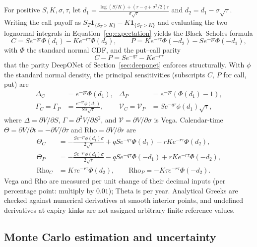 \documentclass[11pt,a4paper]{article}
\begin{document}
For positive \(S,K,\sigma,\tau\), let
\(d_1=\frac{\log(S/K)+(r-q+\sigma^2/2)\tau}{\sigma\sqrt\tau}\) and
\(d_2=d_1-\sigma\sqrt\tau\). Writing the call payoff as
\(S_T\mathbf1_{\{S_T>K\}}-K\mathbf1_{\{S_T>K\}}\) and evaluating the two
lognormal integrals in Equation~\eqref{eq:expectation} yields the
Black--Scholes formula \cite{black1973,merton1973}
\begin{equation}
 C=Se^{-q\tau}\Phi(d_1)-Ke^{-r\tau}\Phi(d_2),\qquad
 P=Ke^{-r\tau}\Phi(-d_2)-Se^{-q\tau}\Phi(-d_1),
 \label{eq:bs}
\end{equation}
with \(\Phi\) the standard normal CDF, and the put--call parity
\begin{equation}
 C-P=Se^{-q\tau}-Ke^{-r\tau}
 \label{eq:parity}
\end{equation}
that the parity DeepONet of Section~\ref{sec:deeponet} enforces
structurally. With \(\phi\) the standard normal density, the principal
sensitivities (subscripts \(C\), \(P\) for call, put) are
\begin{align}
 \Delta_C&=e^{-q\tau}\Phi(d_1), &
 \Delta_P&=e^{-q\tau}(\Phi(d_1)-1),\\
 \Gamma_C=\Gamma_P&=\frac{e^{-q\tau}\phi(d_1)}{S\sigma\sqrt\tau}, &
 \mathcal V_C=\mathcal V_P&=Se^{-q\tau}\phi(d_1)\sqrt\tau,
\end{align}
where \(\Delta=\partial V/\partial S\), \(\Gamma=\partial^2V/\partial S^2\),
and \(\mathcal V=\partial V/\partial\sigma\) is Vega. Calendar-time
\(\Theta=\partial V/\partial t=-\partial V/\partial\tau\) and
\(\mathrm{Rho}=\partial V/\partial r\) are
\begin{align}
 \Theta_C&=-\frac{Se^{-q\tau}\phi(d_1)\sigma}{2\sqrt\tau}
       +qSe^{-q\tau}\Phi(d_1)-rKe^{-r\tau}\Phi(d_2),\\
 \Theta_P&=-\frac{Se^{-q\tau}\phi(d_1)\sigma}{2\sqrt\tau}
       -qSe^{-q\tau}\Phi(-d_1)+rKe^{-r\tau}\Phi(-d_2),\\
 \mathrm{Rho}_C&=K\tau e^{-r\tau}\Phi(d_2),\qquad
 \mathrm{Rho}_P=-K\tau e^{-r\tau}\Phi(-d_2).
\end{align}
Vega and Rho are measured per unit change of their decimal inputs (per
percentage point: multiply by \(0.01\)); Theta is per year. Analytical
Greeks are checked against numerical derivatives at smooth interior
points, and undefined derivatives at expiry kinks are not assigned
arbitrary finite reference values.

\subsection{Monte Carlo estimation and uncertainty}
\end{document}
